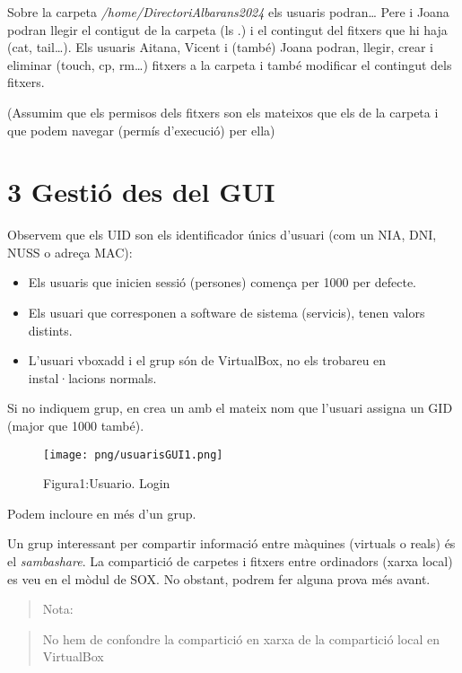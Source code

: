 \documentclass[
  a4paper,
]{article}
\providecommand{\tightlist}{%
  \setlength{\itemsep}{0pt}\setlength{\parskip}{0pt}}
\begin{document}
Sobre la carpeta \emph{/home/DirectoriAlbarans2024} els usuaris
podran\ldots{} Pere i Joana podran llegir el contigut de la carpeta (ls
.) i el contingut del fitxers que hi haja (cat, tail\ldots). Els usuaris
Aitana, Vicent i (també) Joana podran, llegir, crear i eliminar (touch,
cp, rm\ldots) fitxers a la carpeta i també modificar el contingut dels
fitxers.

(Assumim que els permisos dels fitxers son els mateixos que els de la
carpeta i que podem navegar (permís d'execució) per ella)

\section{3 Gestió des del GUI}\label{gestiuxf3-des-del-gui}

Observem que els UID son els identificador únics d'usuari (com un NIA,
DNI, NUSS o adreça MAC):

\begin{itemize}
\tightlist
\item
  Els usuaris que inicien sessió (persones) comença per 1000 per
  defecte.
\item
  Els usuari que corresponen a software de sistema (servicis), tenen
  valors distints.
\item
  L'usuari vboxadd i el grup són de VirtualBox, no els trobareu en
  instal·lacions normals.
\end{itemize}

Si no indiquem grup, en crea un amb el mateix nom que l'usuari assigna
un GID (major que 1000 també).

\begin{figure}
\centering
\texttt{[image: png/usuarisGUI1.png]}
\caption{Figura1:Usuario. Login}
\end{figure}

Podem incloure en més d'un grup.

Un grup interessant per compartir informació entre màquines (virtuals o
reals) és el \emph{sambashare}. La compartició de carpetes i fitxers
entre ordinadors (xarxa local) es veu en el mòdul de SOX. No obstant,
podrem fer alguna prova més avant.

\begin{quote}
Nota:
\end{quote}

\begin{quote}
No hem de confondre la compartició en xarxa de la compartició local en
VirtualBox
\end{quote}
\end{document}
